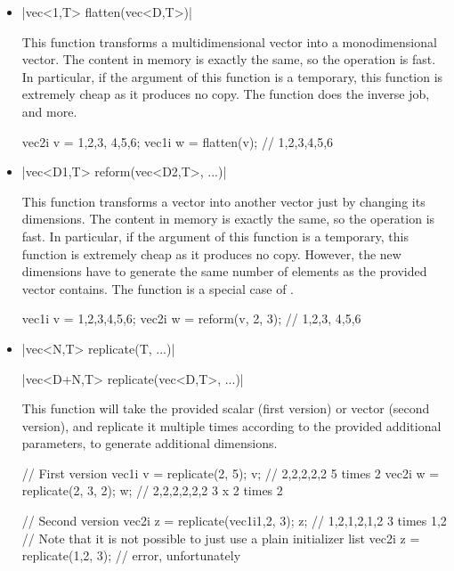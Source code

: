 \documentclass[12pt]{report}
\newenvironment{example}
{
    \begin{mdframed}[style=example,frametitle={Example}]
}
{
    \end{mdframed}
}
\begin{document}
\begin{itemize}
\item \cppinline|vec<1,T> flatten(vec<D,T>)| 

This function transforms a multidimensional vector into a monodimensional vector. The content in memory is exactly the same, so the operation is fast. In particular, if the argument of this function is a temporary, this function is extremely cheap as it produces no copy. The  function does the inverse job, and more.

\begin{example}
\begin{cppcode}
vec2i v = {{1,2,3}, {4,5,6}};
vec1i w = flatten(v); // {1,2,3,4,5,6}
\end{cppcode}
\end{example}

\item \cppinline|vec<D1,T> reform(vec<D2,T>, ...)| 

This function transforms a vector into another vector just by changing its dimensions. The content in memory is exactly the same, so the operation is fast. In particular, if the argument of this function is a temporary, this function is extremely cheap as it produces no copy. However, the new dimensions have to generate the same number of elements as the provided vector contains. The  function is a special case of .

\begin{example}
\begin{cppcode}
vec1i v = {1,2,3,4,5,6};
vec2i w = reform(v, 2, 3); // {{1,2,3}, {4,5,6}}
\end{cppcode}
\end{example}

\item \cppinline|vec<N,T>   replicate(T, ...)| 

      \cppinline|vec<D+N,T> replicate(vec<D,T>, ...)|

This function will take the provided scalar (first version) or vector (second version), and replicate it multiple times according to the provided additional parameters, to generate additional dimensions.

\begin{example}
\begin{cppcode}
// First version
vec1i v = replicate(2, 5);
v; // {2,2,2,2,2} 5 times 2
vec2i w = replicate(2, 3, 2);
w; // {{2,2},{2,2},{2,2}} 3 x 2 times 2

// Second version
vec2i z = replicate(vec1i{1,2}, 3);
z; // {{1,2},{1,2},{1,2}} 3 times {1,2}
// Note that it is not possible to just use a plain initializer list
vec2i z = replicate({1,2}, 3); // error, unfortunately
\end{cppcode}
\end{example}
\end{itemize}
\end{document}
